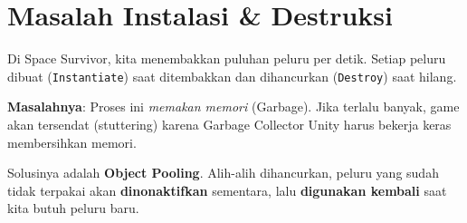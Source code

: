 
\section{Masalah Instalasi \& Destruksi}

Di Space Survivor, kita menembakkan puluhan peluru per detik. Setiap peluru dibuat (\texttt{Instantiate}) saat ditembakkan dan dihancurkan (\texttt{Destroy}) saat hilang.

\textbf{Masalahnya}: Proses ini \textit{memakan memori} (Garbage). Jika terlalu banyak, game akan tersendat (stuttering) karena Garbage Collector Unity harus bekerja keras membersihkan memori.

Solusinya adalah \textbf{Object Pooling}.
Alih-alih dihancurkan, peluru yang sudah tidak terpakai akan \textbf{dinonaktifkan} sementara, lalu \textbf{digunakan kembali} saat kita butuh peluru baru.
